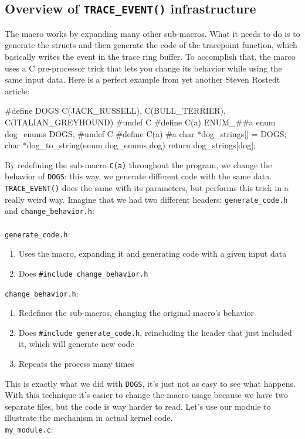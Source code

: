 \subsection{Overview of \texttt{TRACE\_EVENT()} infrastructure}
The macro works by expanding many other sub-macros. What it needs to do is to generate the structs and then generate the code of the tracepoint function, which basically writes the event in the trace ring buffer. To accomplish that, the marco uses a C pre-processor trick that lets you change its behavior while using the same input data. Here is a perfect example from yet another Steven Rostedt article:\cite{trace_event}
\begin{code}
#define DOGS { C(JACK_RUSSELL), C(BULL_TERRIER), C(ITALIAN_GREYHOUND) }
#undef C
#define C(a) ENUM_##a
enum dog_enums DOGS;
#undef C
#define C(a) #a
char *dog_strings[] = DOGS;
char *dog_to_string(enum dog_enums dog)
{
       return dog_strings[dog];
}
\end{code}
By redefining the sub-macro \verb|C(a)| throughout the program, we change the behavior of \verb|DOGS|: this way, we generate different code with the same data. \verb|TRACE_EVENT()| does the same with its parameters, but performs this trick in a really weird way. Imagine that we had two different headers: \verb|generate_code.h| and \verb|change_behavior.h|:\\\\\verb|generate_code.h|:
\begin{enumerate}
    \item Uses the macro, expanding it and generating code with a given input data
    \item Does \verb|#include change_behavior.h|
\end{enumerate}
\verb|change_behavior.h|:
\begin{enumerate}
    \item Redefines the sub-macros, changing the original macro's behavior
    \item Does \verb|#include generate_code.h|, reincluding the header that just included it, which will generate new code
    \item Repeats the process many times
\end{enumerate}
This is exactly what we did with \verb|DOGS|, it's just not as easy to see what happens. With this technique it's easier to change the macro usage because we have two separate files, but the code is way harder to read. Let's use our module to illustrate the mechanism in actual kernel code.\\\verb|my_module.c|:

